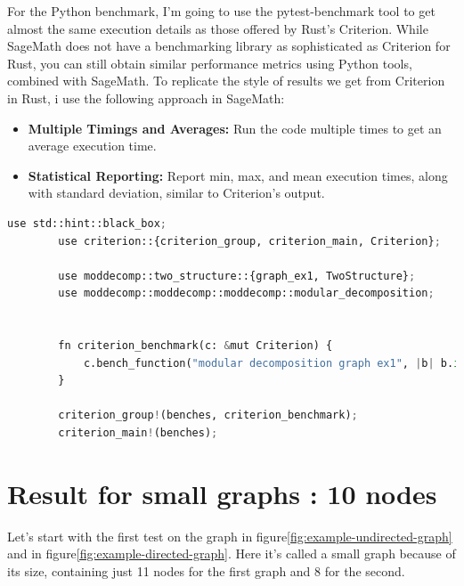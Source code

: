 For the Python benchmark, I'm going to use the pytest-benchmark\cite{pytestbenchmark} tool to get almost the same execution details as those offered by Rust's Criterion.
While SageMath does not have a benchmarking library as sophisticated as Criterion for Rust, you can still obtain similar performance metrics using Python tools, combined with SageMath.
To replicate the style of results we get from Criterion in Rust, i use the following approach in SageMath:
\begin{itemize}
    \item \textbf{Multiple Timings and Averages:} Run the code multiple times to get an average execution time.
    \item \textbf{Statistical Reporting:} Report min, max, and mean execution times, along with standard deviation, similar to Criterion’s output.
\end{itemize}

\begin{myex}
    \begin{lstlisting}[language=Python, style=python, caption={Example of benchmark code for modular decomposition}, label={lst:sagemath-example-of-benchmark-code}, firstnumber=1]
        use std::hint::black_box;
        use criterion::{criterion_group, criterion_main, Criterion};

        use moddecomp::two_structure::{graph_ex1, TwoStructure};
        use moddecomp::moddecomp::moddecomp::modular_decomposition;


        fn criterion_benchmark(c: &mut Criterion) {
            c.bench_function("modular decomposition graph ex1", |b| b.iter(|| modular_decomposition(black_box(&mut graph_ex1()), black_box(None))));
        }

        criterion_group!(benches, criterion_benchmark);
        criterion_main!(benches);
    \end{lstlisting}
\end{myex}


\section{Result for small graphs : 10 nodes}\label{sec:result-for-small-graphs}

Let's start with the first test on the graph in figure\ref{fig:example-undirected-graph} and in figure\ref{fig:example-directed-graph}.
Here it's called a small graph because of its size, containing just 11 nodes for the first graph and 8 for the second.

